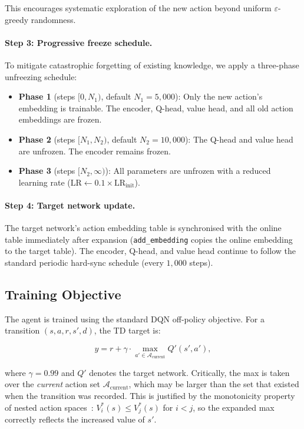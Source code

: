 \documentclass{article}
\begin{document}
This encourages systematic exploration of the new action beyond uniform
$\varepsilon$-greedy randomness.

\paragraph{Step 3: Progressive freeze schedule.}
To mitigate catastrophic forgetting of existing knowledge, we apply a three-phase
unfreezing schedule:

\begin{itemize}[nosep]
  \item \textbf{Phase 1} (steps $[0, N_1)$, default $N_1=5{,}000$): Only the
  new action's embedding is trainable. The encoder, Q-head, value head, and
  all old action embeddings are frozen.
  \item \textbf{Phase 2} (steps $[N_1, N_2)$, default $N_2=10{,}000$): The
  Q-head and value head are unfrozen. The encoder remains frozen.
  \item \textbf{Phase 3} (steps $[N_2, \infty)$): All parameters are unfrozen
  with a reduced learning rate ($\text{LR} \leftarrow 0.1 \times
  \text{LR}_\text{init}$).
\end{itemize}

\paragraph{Step 4: Target network update.}
The target network's action embedding table is synchronised with the online
table immediately after expansion (\texttt{add\_embedding} copies the online
embedding to the target table). The encoder, Q-head, and value head continue to
follow the standard periodic hard-sync schedule (every $1{,}000$ steps).

\subsection{Training Objective}

The agent is trained using the standard DQN off-policy objective. For a
transition $(s, a, r, s', d)$, the TD target is:

\begin{equation}
y = r + \gamma \cdot \max_{a' \in \mathcal{A}_\text{current}} Q'(s', a'),
\label{eq:td_target}
\end{equation}

where $\gamma=0.99$ and $Q'$ denotes the target network. Critically, the max
is taken over the \emph{current} action set $\mathcal{A}_\text{current}$, which
may be larger than the set that existed when the transition was recorded. This
is justified by the monotonicity property of nested action
spaces~\cite{farquhar2020growing}: $V^*_i(s) \leq V^*_j(s)$ for $i < j$, so
the expanded max correctly reflects the increased value of $s'$.
\end{document}
